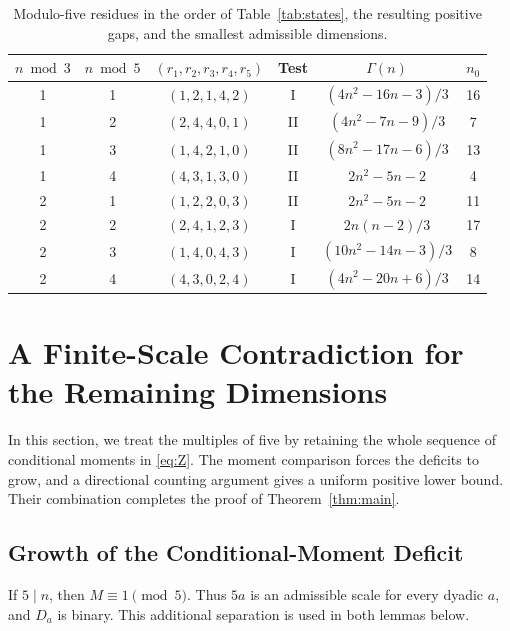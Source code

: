 \documentclass[12pt,letterpaper,onecolumn]{article}
\theoremstyle{definition}
\begin{document}
\begin{table}[t]
\caption{Modulo-five residues in the order of Table~\ref{tab:states}, the resulting positive gaps, and the smallest admissible dimensions.}
\label{tab:gaps}
\centering
\small
\setlength{\tabcolsep}{5pt}
\renewcommand{\arraystretch}{1.14}
\begin{tabular}{cccccc}
\toprule
$n\bmod3$&$n\bmod5$&$(r_1,r_2,r_3,r_4,r_5)$&Test&$\Gamma(n)$&$n_0$\\
\midrule
1&1&$(1,2,1,4,2)$&I&$(4n^2-16n-3)/3$&16\\
1&2&$(2,4,4,0,1)$&II&$(4n^2-7n-9)/3$&7\\
1&3&$(1,4,2,1,0)$&II&$(8n^2-17n-6)/3$&13\\
1&4&$(4,3,1,3,0)$&II&$2n^2-5n-2$&4\\
2&1&$(1,2,2,0,3)$&II&$2n^2-5n-2$&11\\
2&2&$(2,4,1,2,3)$&I&$2n(n-2)/3$&17\\
2&3&$(1,4,0,4,3)$&I&$(10n^2-14n-3)/3$&8\\
2&4&$(4,3,0,2,4)$&I&$(4n^2-20n+6)/3$&14\\
\bottomrule
\end{tabular}
\end{table}

 \section{A Finite-Scale Contradiction for the Remaining Dimensions}\label{sec:dyadic}
In this section, we treat the multiples of five by retaining the whole sequence of conditional moments in \eqref{eq:Z}. The moment comparison forces the deficits to grow, and a directional counting argument gives a uniform positive lower bound. Their combination completes the proof of Theorem~\ref{thm:main}.

\subsection{Growth of the Conditional-Moment Deficit}
If $5\mid n$, then $M\equiv1\pmod5$. Thus $5a$ is an admissible scale for every dyadic $a$, and $D_a$ is binary. This additional separation is used in both lemmas below.
\end{document}
